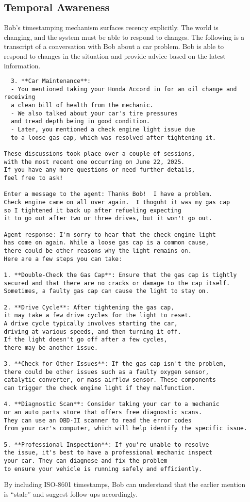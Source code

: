 \documentclass[11pt]{article}
\begin{document}
\subsection{Temporal Awareness}
Bob’s timestamping mechanism surfaces recency explicitly. The world is changing, and the system must be able to respond to changes.  The following is a transcript of a conversation with Bob about a car problem.  Bob is able to respond to changes in the situation and provide advice based on the latest information.
\begin{verbatim}
  3. **Car Maintenance**:
  - You mentioned taking your Honda Accord in for an oil change and receiving 
  a clean bill of health from the mechanic.
  - We also talked about your car's tire pressures 
  and tread depth being in good condition.
  - Later, you mentioned a check engine light issue due 
  to a loose gas cap, which was resolved after tightening it.

These discussions took place over a couple of sessions, 
with the most recent one occurring on June 22, 2025. 
If you have any more questions or need further details, 
feel free to ask!

Enter a message to the agent: Thanks Bob!  I have a problem.  
Check engine came on all over again.  I thoguht it was my gas cap 
so I tightened it back up after refueling expecting 
it to go out after two or three drives, but it won't go out.

Agent response: I'm sorry to hear that the check engine light 
has come on again. While a loose gas cap is a common cause, 
there could be other reasons why the light remains on. 
Here are a few steps you can take:

1. **Double-Check the Gas Cap**: Ensure that the gas cap is tightly 
secured and that there are no cracks or damage to the cap itself. 
Sometimes, a faulty gas cap can cause the light to stay on.

2. **Drive Cycle**: After tightening the gas cap, 
it may take a few drive cycles for the light to reset. 
A drive cycle typically involves starting the car, 
driving at various speeds, and then turning it off. 
If the light doesn't go off after a few cycles, 
there may be another issue.

3. **Check for Other Issues**: If the gas cap isn't the problem, 
there could be other issues such as a faulty oxygen sensor, 
catalytic converter, or mass airflow sensor. These components 
can trigger the check engine light if they malfunction.

4. **Diagnostic Scan**: Consider taking your car to a mechanic 
or an auto parts store that offers free diagnostic scans. 
They can use an OBD-II scanner to read the error codes 
from your car's computer, which will help identify the specific issue.

5. **Professional Inspection**: If you're unable to resolve 
the issue, it's best to have a professional mechanic inspect 
your car. They can diagnose and fix the problem 
to ensure your vehicle is running safely and efficiently.

\end{verbatim}
By including ISO-8601 timestamps, Bob can understand that the earlier mention is “stale” and suggest follow-ups accordingly.
\end{document}
